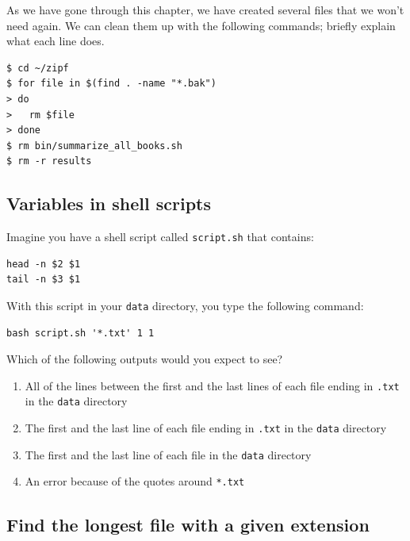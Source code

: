 \documentclass[
]{krantz}
\providecommand{\tightlist}{%
  \setlength{\itemsep}{0pt}\setlength{\parskip}{0pt}}
\begin{document}
As we have gone through this chapter,
we have created several files that we won't need again.
We can clean them up with the following commands;
briefly explain what each line does.

\begin{verbatim}
$ cd ~/zipf
$ for file in $(find . -name "*.bak")
> do
>   rm $file
> done
$ rm bin/summarize_all_books.sh
$ rm -r results
\end{verbatim}

\hypertarget{bash-advanced-ex-script-variables}{%
\subsection{Variables in shell scripts}\label{bash-advanced-ex-script-variables}}

Imagine you have a shell script called \texttt{script.sh} that contains:

\begin{verbatim}
head -n $2 $1
tail -n $3 $1
\end{verbatim}

With this script in your \texttt{data} directory, you type the following command:

\begin{verbatim}
bash script.sh '*.txt' 1 1
\end{verbatim}

Which of the following outputs would you expect to see?

\begin{enumerate}
\def\labelenumi{\arabic{enumi}.}
\tightlist
\item
  All of the lines between the first and the last lines of each file ending in \texttt{.txt}
  in the \texttt{data} directory
\item
  The first and the last line of each file ending in \texttt{.txt} in the \texttt{data} directory
\item
  The first and the last line of each file in the \texttt{data} directory
\item
  An error because of the quotes around \texttt{*.txt}
\end{enumerate}

\hypertarget{bash-advanced-ex-longest-with-extension}{%
\subsection{Find the longest file with a given extension}\label{bash-advanced-ex-longest-with-extension}}
\end{document}
